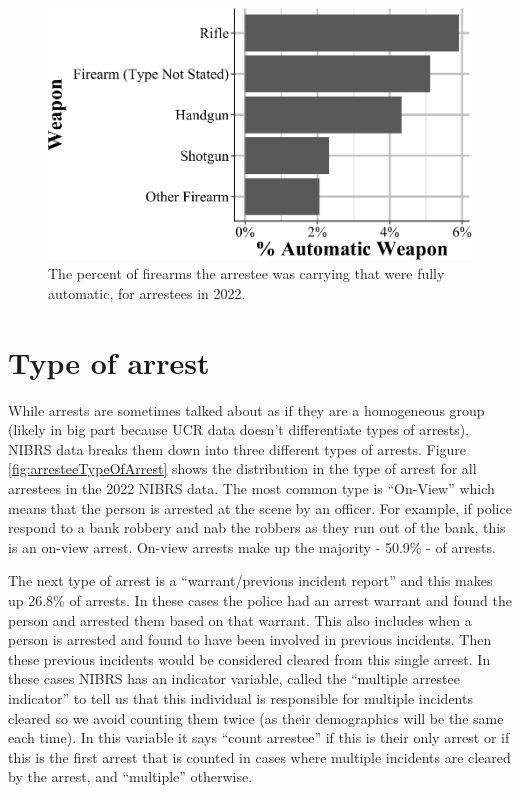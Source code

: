 \documentclass[
  12pt,
  openany]{book}
\begin{document}
\begin{figure}

{\centering \includegraphics[width=0.9\linewidth]{16_nibrs_arrestee_files/figure-latex/arresteeAutomaticWeapon-1} 

}

\caption{The percent of firearms the arrestee was carrying that were fully automatic, for arrestees in 2022.}\label{fig:arresteeAutomaticWeapon}
\end{figure}

\section{Type of arrest}\label{type-of-arrest}

While arrests are sometimes talked about as if they are a homogeneous group (likely in big part because UCR data doesn't differentiate types of arrests), NIBRS data breaks them down into three different types of arrests. Figure \ref{fig:arresteeTypeOfArrest} shows the distribution in the type of arrest for all arrestees in the 2022 NIBRS data. The most common type is ``On-View'' which means that the person is arrested at the scene by an officer. For example, if police respond to a bank robbery and nab the robbers as they run out of the bank, this is an on-view arrest. On-view arrests make up the majority - 50.9\% - of arrests.

The next type of arrest is a ``warrant/previous incident report'' and this makes up 26.8\% of arrests. In these cases the police had an arrest warrant and found the person and arrested them based on that warrant. This also includes when a person is arrested and found to have been involved in previous incidents. Then these previous incidents would be considered cleared from this single arrest. In these cases NIBRS has an indicator variable, called the ``multiple arrestee indicator'' to tell us that this individual is responsible for multiple incidents cleared so we avoid counting them twice (as their demographics will be the same each time). In this variable it says ``count arrestee'' if this is their only arrest or if this is the first arrest that is counted in cases where multiple incidents are cleared by the arrest, and ``multiple'' otherwise.
\end{document}
